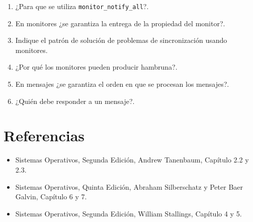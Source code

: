 \begin{enumerate}
\item ¿Para que se utiliza \texttt{monitor\_notify\_all}?.

\item En monitores ¿se garantiza la entrega de la propiedad del monitor?.

\item Indique el patrón de solución de problemas de sincronización usando
monitores.

\item ¿Por qué los monitores pueden producir hambruna?.

\item En mensajes ¿se garantiza el orden en que se procesan los mensajes?.

\item ¿Quién debe responder a un mensaje?.

\end{enumerate}

\section{Referencias}
\begin{itemize}

\item Sistemas Operativos, Segunda Edición, Andrew Tanenbaum, Capítulo 2.2 y
2.3.

\item Sistemas Operativos, Quinta Edición, Abraham Silberschatz y Peter
Baer Galvin, Capítulo 6 y 7.

\item Sistemas Operativos, Segunda Edición, William Stallings, Capítulo 4 y 5.

\end{itemize}
